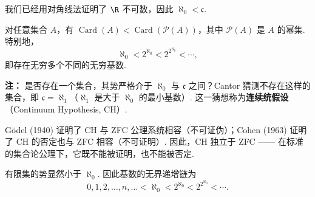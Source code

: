 我们已经用对角线法证明了 $\R$ 不可数，因此 $\aleph_0 < \mathfrak{c}$.

\begin{theorem}[Cantor]
	对任意集合 $A$，有 $\operatorname{Card}(A) < \operatorname{Card}(\mathcal{P}(A))$，其中 $\mathcal{P}(A)$ 是 $A$ 的幂集. 特别地，
	\[
	\aleph_0 < 2^{\aleph_0} < 2^{2^{\aleph_0}} < \cdots,
	\]
	即存在无穷多个不同的无穷基数.
\end{theorem}

\textbf{注：}
	是否存在一个集合，其势严格介于 $\aleph_0$ 与 $\mathfrak{c}$ 之间？Cantor 猜测不存在这样的集合，即 $\mathfrak{c} = \aleph_1$（$\aleph_1$ 是大于 $\aleph_0$ 的最小基数）. 这一猜想称为\textbf{连续统假设}（Continuum Hypothesis, CH）.
	
	G\"{o}del (1940) 证明了 CH 与 ZFC 公理系统相容（不可证伪）；Cohen (1963) 证明了 CH 的否定也与 ZFC 相容（不可证明）. 因此，CH 独立于 ZFC —— 在标准的集合论公理下，它既不能被证明，也不能被否定.



	有限集的势显然小于 $\aleph_0$. 因此基数的无界递增链为
	\[
	0, 1, 2, \ldots, n, \ldots < \aleph_0 < 2^{\aleph_0} < 2^{2^{\aleph_0}} < \cdots.
	\]


